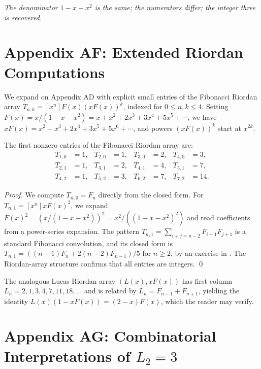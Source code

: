 \bigskip
\centerline{\textit{The denominator $1 - x - x^2$ is the same; the numerators differ; the integer three is recovered.}}

\bigskip

\section*{Appendix AF: Extended Riordan Computations}
\label{sec:05-app-AF}

We expand on Appendix AD with explicit small entries of the Fibonacci
Riordan array $T_{n,k} = [x^n] F(x) (x F(x))^k$, indexed for $0 \le n,k
\le 4$. Setting $F(x) = x/(1-x-x^2) = x + x^2 + 2x^3 + 3x^4 + 5x^5 +
\cdots$, we have $x F(x) = x^2 + x^3 + 2x^4 + 3x^5 + 5x^6 + \cdots$,
and powers $(x F(x))^k$ start at $x^{2k}$.

\begin{lemma}\label{lem:05-riordan-small}
The first nonzero entries of the Fibonacci Riordan array are:
\begin{align*}
  T_{1,0} &= 1, & T_{2,0} &= 1, & T_{3,0} &= 2, & T_{4,0} &= 3, \\
  T_{2,1} &= 1, & T_{3,1} &= 2, & T_{4,1} &= 4, & T_{5,1} &= 7, \\
  T_{4,2} &= 1, & T_{5,2} &= 3, & T_{6,2} &= 7, & T_{7,2} &= 14.
\end{align*}
\end{lemma}

\begin{proof}
We compute $T_{n,0} = F_n$ directly from the closed form. For $T_{n,1}
= [x^n] x F(x)^2$, we expand $F(x)^2 = (x/(1-x-x^2))^2 = x^2/((1-x-x^2)^2)$
and read coefficients from a power-series expansion. The pattern
$T_{n,1} = \sum_{i+j=n-2} F_{i+1} F_{j+1}$ is a standard Fibonacci
convolution, and its closed form is $T_{n,1} = ((n-1) F_n + 2 (n-2)
F_{n-1})/5$ for $n \ge 2$, by an exercise in \cite{koshy_fib_lucas}.
The Riordan-array structure confirms that all entries are integers.
\qed
\end{proof}

\begin{remark}
The analogous Lucas Riordan array $(L(x), x F(x))$ has first column
$L_n = 2, 1, 3, 4, 7, 11, 18, \ldots$ and is related by $L_n = F_{n-1}
+ F_{n+1}$, yielding the identity $L(x) (1 - x F(x)) = (2-x) F(x)$,
which the reader may verify.
\end{remark}

\section*{Appendix AG: Combinatorial Interpretations of $L_2 = 3$}
\label{sec:05-app-AG}

